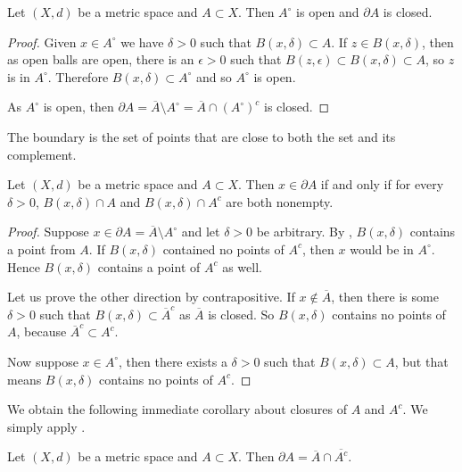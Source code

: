 \documentclass[12pt]{book}
\begin{document}
\begin{prop}
Let $(X,d)$ be a metric space and $A \subset X$.
Then $A^\circ$ is open
and $\partial A$ is closed.
\end{prop}

\begin{proof}
Given $x \in A^\circ$ we have $\delta > 0$ such that $B(x,\delta)
\subset A$.
If $z \in B(x,\delta)$, then as open balls are open,
there is an $\epsilon > 0$ such that $B(z,\epsilon) \subset B(x,\delta)
\subset A$, so $z$ is in $A^\circ$.
Therefore $B(x,\delta) \subset
A^\circ$ and so $A^\circ$ is open.

As $A^\circ$ is open, then
$\partial A = \overline{A} \setminus A^\circ = \overline{A} \cap
{(A^\circ)}^c$ is closed.
\end{proof}

The boundary is the set of points that are close to both the set and its
complement.

\begin{prop}
Let $(X,d)$ be a metric space and $A \subset X$.
Then $x \in \partial A$
if and only if for every $\delta > 0$,
$B(x,\delta) \cap A$ and
$B(x,\delta) \cap A^c$ are both nonempty.
\end{prop}

\begin{proof}
Suppose $x \in \partial A =  \overline{A} \setminus A^\circ$ and
let $\delta > 0$ be arbitrary.
By , $B(x,\delta)$ contains
a point from $A$.
If $B(x,\delta)$ contained no points of $A^c$,
then $x$ would be in $A^\circ$.
Hence $B(x,\delta)$ contains a point of
$A^c$ as well.

Let us prove the other direction by contrapositive.
If $x \notin \overline{A}$, then there is some $\delta > 0$ such that
$B(x,\delta) \subset \overline{A}^c$ as $\overline{A}$ is closed.
So $B(x,\delta)$ contains no points of $A$, because $\overline{A}^c \subset
A^c$.

Now suppose $x \in A^\circ$, then there exists a $\delta > 0$
such that $B(x,\delta) \subset A$, but that means $B(x,\delta)$
contains no points of $A^c$.
\end{proof}

We obtain the following immediate corollary about closures of $A$ and $A^c$.
We
simply apply .

\begin{cor}
Let $(X,d)$ be a metric space and $A \subset X$.
Then $\partial A = \overline{A} \cap \overline{A^c}$.
\end{cor}
\end{document}
